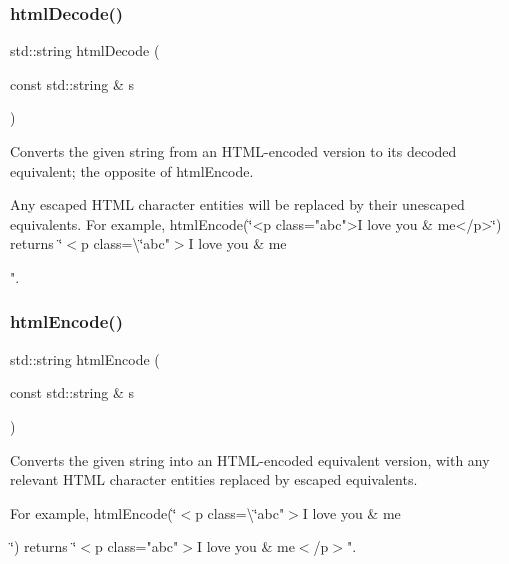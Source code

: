 \subsubsection{\texorpdfstring{html\+Decode()}{htmlDecode()}}
{\footnotesize\ttfamily std\+::string html\+Decode (\begin{DoxyParamCaption}\item[{const std\+::string \&}]{s }\end{DoxyParamCaption})}



Converts the given string from an H\+T\+M\+L-\/encoded version to its decoded equivalent; the opposite of html\+Encode. 

Any escaped H\+T\+ML character entities will be replaced by their unescaped equivalents. For example, {\ttfamily html\+Encode(\char`\"{}<p class="abc">\+I love you \& me</p>\char`\"{}) returns \char`\"{}$<$p class=\textbackslash{}\char`\"{}abc"$>$I love you \& me}

{\ttfamily ". }\mbox{\label{namespacesgl_1_1priv_1_1strlib_a21319276d7e93ef843ec933eba1d30ba}} 
\subsubsection{\texorpdfstring{html\+Encode()}{htmlEncode()}}
{\footnotesize\ttfamily std\+::string html\+Encode (\begin{DoxyParamCaption}\item[{const std\+::string \&}]{s }\end{DoxyParamCaption})}



Converts the given string into an H\+T\+M\+L-\/encoded equivalent version, with any relevant H\+T\+ML character entities replaced by escaped equivalents. 

For example, {\ttfamily html\+Encode(\char`\"{}$<$p class=\textbackslash{}\char`\"{}abc"$>$I love you \& me}

{\ttfamily \char`\"{}) returns
\char`\"{}$<$p class="abc"$>$I love you \& me$<$/p$>$". }\mbox{\label{namespacesgl_1_1priv_1_1strlib_ac00729dfe0ba994523cf8591a16c1f8e}} 
